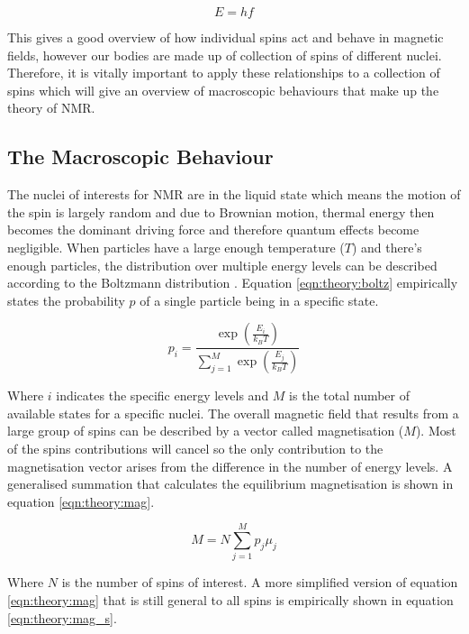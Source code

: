 \documentclass[class=article, crop=false]{standalone}
\begin{document}
\begin{equation}
    E = hf
    \label{eqn:theory:ELamor}
\end{equation}

This gives a good overview of how individual spins act and behave in magnetic fields, however our bodies are made up of collection of spins of different nuclei. Therefore, it is vitally important to apply these relationships to a collection of spins which will give an overview of macroscopic behaviours that make up the theory of NMR.

\subsection{The Macroscopic Behaviour}

The nuclei of interests for NMR are in the liquid state which means the motion of the spin is largely random and due to Brownian motion, thermal energy then becomes the dominant driving force and therefore quantum effects become negligible. When particles have a large enough temperature ($T$) and there's enough particles, the distribution over multiple energy levels can be described according to the Boltzmann distribution \cite{Boltzmann1872WeitereGasmolekulen}. Equation \ref{eqn:theory:boltz} empirically states the probability $p$ of a single particle being in a specific state.

\begin{equation}
    p_i = \frac{\exp\left(\frac{E_i}{k_BT}\right)}{\displaystyle \sum_{j = 1}^{M}\exp\left(\frac{E_j}{k_BT}\right)}
    \label{eqn:theory:boltz}
\end{equation}

Where $i$ indicates the specific energy levels and $M$ is the total number of available states for a specific nuclei. The overall magnetic field that results from a large group of spins can be described by a vector called magnetisation ($M$). Most of the spins contributions will cancel so the only contribution to the magnetisation vector arises from the difference in the number of energy levels. A generalised summation that calculates the equilibrium magnetisation is shown in equation \ref{eqn:theory:mag}.

\begin{equation}
    M = N\sum_{j = 1}^{M}p_j\mu_j
    \label{eqn:theory:mag}
\end{equation}

Where $N$ is the number of spins of interest. A more simplified version of equation \ref{eqn:theory:mag} that is still general to all spins is empirically shown in equation \ref{eqn:theory:mag_s}.
\end{document}
